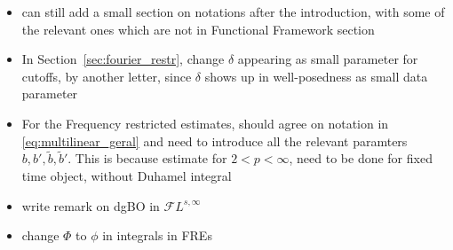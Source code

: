 \documentclass[%
11pt,  reqno]{amsart}
\newcommand{\5}{\textup{V}}
\newcommand{\FL}{\mathcal{F} L}
\newcommand{\dl}{\delta}
\newcommand{\wt}{\widetilde}
\theoremstyle{remark}
\newcommand{\R}{\mathbb{R}}
\newcommand{\T}{\mathbb{T}}
\numberwithin{equation}{section}
\numberwithin{theorem}{section}
\begin{document}
\begin{itemize}
\item can still add a small section on notations after the introduction, with some of the relevant ones which are not in Functional Framework section

\item In
Section~\ref{sec:fourier_restr}, change $\dl$ appearing as small parameter for cutoffs, by another letter, since $\dl$ shows up in well-posedness as small data parameter

\item For the Frequency restricted estimates, should agree on notation in \eqref{eq:multilinear_geral}
 and need to introduce all the relevant paramters $b, b', \wt b , \wt b '$. This is because estimate for $2<p<\infty$, need to be done for fixed time object, without Duhamel integral

 \item write remark on dgBO in $\FL^{s, \infty}$

 \item change $\Phi$ to $\phi$ in integrals in FREs


    \end{itemize}


    
    \newpage
	
	
	
	
		
		
		
		
		
		
		
		
		
		
		
		
\end{document}
